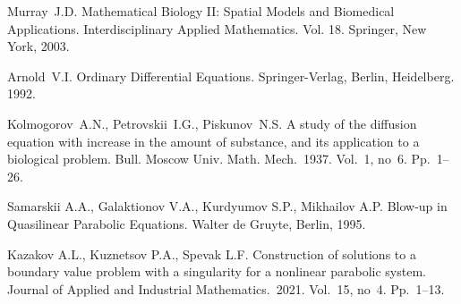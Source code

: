 \documentclass[12pt]{llncs}
\begin{document}
\begin{thebibliography}{9} %
	Murray~J.D. Mathematical Biology II: Spatial Models and Biomedical Applications. Interdisciplinary Applied Mathematics. Vol. 18. Springer, New York, 2003.
	
	Arnold~V.I. Ordinary Differential Equations. Springer-Verlag, Berlin, Heidelberg. 1992.
	
	Kolmogorov~A.N., Petrovskii~I.G., Piskunov~N.S. A study of the diffusion equation with increase in the amount of substance, and its application to a biological problem. Bull. Moscow Univ. Math. Mech.~1937. Vol.~1, no~6. Pp.~1--26.
	
	
	
	Samarskii A.A., Galaktionov V.A., Kurdyumov S.P., Mikhailov A.P. Blow-up in Quasilinear Parabolic Equations. Walter de Gruyte, Berlin, 1995.
	
	
	
	Kazakov A.L., Kuznetsov P.A., Spevak L.F. Construction of solutions to a boundary value problem with a singularity for a nonlinear parabolic system. Journal of Applied and Industrial Mathematics.~2021. Vol.~15, no~4. Pp.~1--13.
	

\end{thebibliography}

\end{document}
